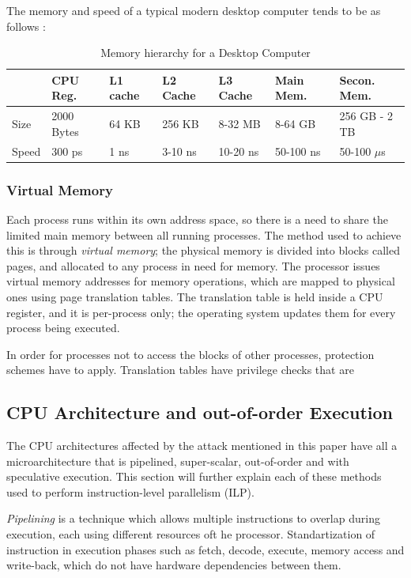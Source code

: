 \documentclass[sigconf]{acmart}
\begin{document}
The memory and speed of a typical modern desktop computer \cite{Hennessy:2017:CAS:3207796} tends to be as follows :

\begin{table}[h]
  \label{tab:freq}
  \begin{tabular}{p{0.66cm}|p{0.75cm}p{0.75cm}p{0.75cm}p{0.75cm}p{1cm}p{1cm}}
     & \textbf{CPU Reg.} & \textbf{L1 cache} & \textbf{L2 Cache} & \textbf{L3 Cache} & \textbf{Main Mem.} & \textbf{Secon. Mem.}\\
     \hline
    Size & 2000 Bytes & 64 KB & 256 KB & 8-32 MB & 8-64 GB & 256 GB - 2 TB\\
    \hline
    Speed & 300 ps & 1 ns & 3-10 ns & 10-20 ns & 50-100 ns & 50-100 $\mu$s\\
\end{tabular}
\caption{Memory hierarchy for a Desktop Computer}
\end{table}

\subsubsection{Virtual Memory}
Each process runs within its own address space, so there is a need to share the limited main memory between all running processes. The method used to achieve this is through {\itshape virtual memory}; the physical memory is divided into blocks called pages, and allocated to any process in need for memory. The processor issues virtual memory addresses for memory operations, which are mapped to physical ones using page translation tables. The translation table is held inside a CPU register, and it is per-process only; the operating system updates them for every process being executed. 

In order for processes not to access the blocks of other processes, protection schemes have to apply. Translation tables have privilege checks that are 

\subsection{CPU Architecture and out-of-order Execution}

The CPU architectures affected by the attack mentioned in this paper have all a microarchitecture that is pipelined, super-scalar, out-of-order and with speculative execution. This section will further explain each of these methods used to perform instruction-level parallelism (ILP).

{\itshape Pipelining} is a technique which allows multiple instructions to overlap during execution, each using different resources oft he processor. Standartization of instruction in execution phases such as fetch, decode, execute, memory access and write-back, which do not have hardware dependencies between them. 
\end{document}
